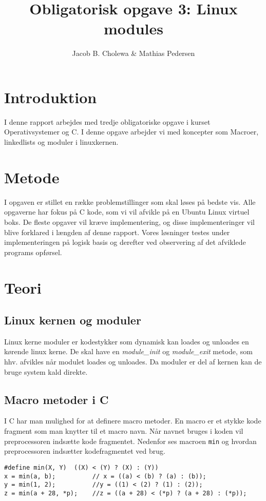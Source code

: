 \documentclass[danish]{report}
\title{Obligatorisk opgave 3: Linux modules}
\author{Jacob B. Cholewa \& Mathias Pedersen }
\begin{document}
\maketitle
\begingroup
\let\clearpage\relax
\chapter{Introduktion}
I denne rapport arbejdes med tredje obligatoriske opgave i kurset Operativsystemer og C. I denne opgave arbejder vi med koncepter som Macroer, linkedlists og moduler i linuxkernen.

\vspace{20 mm}\chapter{Metode}
I opgaven er stillet en række problemstillinger som skal løses på bedste vis. Alle opgaverne har fokus på C kode, som vi vil afvikle på en Ubuntu Linux virtuel boks. De fleste opgaver vil kræve implementering, og disse implementeringer vil blive forklared i længden af denne rapport. Vores løsninger testes under implementeringen på logisk basis og derefter ved observering af det afviklede programs opførsel.
\endgroup
\chapter{Teori}
\section{Linux kernen og moduler}

Linux kerne moduler er kodestykker som dynamisk kan loades og unloades en kørende linux kerne. De skal have en \textit{module\_init} og \textit{module\_exit} metode, som hhv. afvikles når modulet loades og unloades. Da moduler er del af kernen kan de bruge system kald direkte.

\section{Macro metoder i C}

I C har man mulighed for at definere macro metoder. En macro er et stykke kode fragment som man knytter til et macro navn. Når navnet bruges i koden vil preprocessoren indsætte kode fragmentet. Nedenfor ses macroen \texttt{min} og hvordan preprocessoren indsætter kodefragmentet ved brug.
\begin{lstlisting}
#define min(X, Y)  ((X) < (Y) ? (X) : (Y))
x = min(a, b);          // x = ((a) < (b) ? (a) : (b));
y = min(1, 2);          //y = ((1) < (2) ? (1) : (2));
z = min(a + 28, *p);    //z = ((a + 28) < (*p) ? (a + 28) : (*p));
\end{lstlisting}
\end{document}
